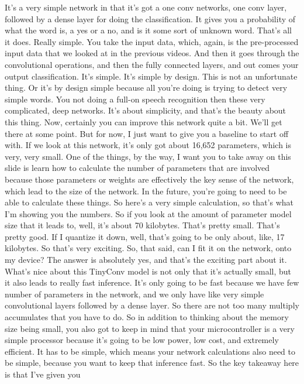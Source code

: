 It's a very simple network in that it's got
a one conv networks, one conv layer, followed by a dense layer
for doing the classification.
It gives you a probability of what the word is, a yes or a no,
and is it some sort of unknown word.
That's all it does.
Really simple.
You take the input data, which, again, is the pre-processed input data that we
looked at in the previous videos.
And then it goes through the convolutional operations, and then
the fully connected layers, and out comes your output classification.
It's simple.
It's simple by design.
This is not an unfortunate thing.
Or it's by design simple because all you're doing
is trying to detect very simple words.
You not doing a full-on speech recognition then
these very complicated, deep networks.
It's about simplicity, and that's the beauty about this thing.
Now, certainly you can improve this network quite a bit.
We'll get there at some point.
But for now, I just want to give you a baseline to start off with.
If we look at this network, it's only got about 16,652 parameters,
which is very, very small.
One of the things, by the way, I want you to take away
on this slide is learn how to calculate the number of parameters that
are involved because those parameters or weights are effectively
the key sense of the network, which lead to the size of the network.
In the future, you're going to need to be able to calculate these things.
So here's a very simple calculation, so that's
what I'm showing you the numbers.
So if you look at the amount of parameter model size that it leads to,
well, it's about 70 kilobytes.
That's pretty small.
That's pretty good.
If I quantize it down, well, that's going to be only about,
like, 17 kilobytes.
So that's very exciting.
So, that said, can I fit it on the network, onto my device?
The answer is absolutely yes, and that's the exciting part about it.
What's nice about this TinyConv model is not only that it's actually small,
but it also leads to really fast inference.
It's only going to be fast because we have few number of parameters
in the network, and we only have like very simple convolutional layers
followed by a dense layer.
So there are not too many multiply accumulates that you have to do.
So in addition to thinking about the memory size being small,
you also got to keep in mind that your microcontroller is
a very simple processor because it's going
to be low power, low cost, and extremely efficient.
It has to be simple, which means your network calculations also
need to be simple, because you want to keep that inference fast.
So the key takeaway here is that I've given you
